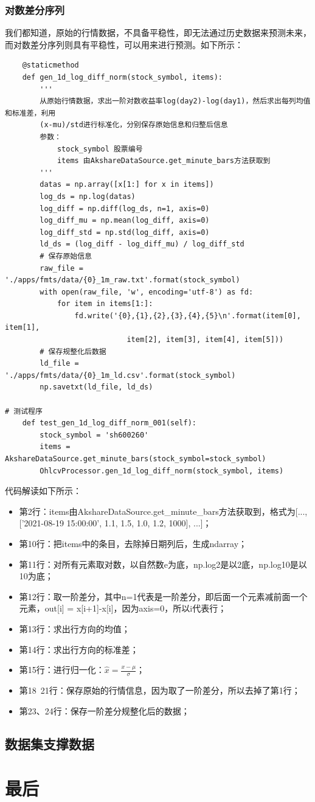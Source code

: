 \subsubsection{对数差分序列}
我们都知道，原始的行情数据，不具备平稳性，即无法通过历史数据来预测未来，而对数差分序列则具有平稳性，可以用来进行预测。如下所示：
\begin{lstlisting}
    @staticmethod
    def gen_1d_log_diff_norm(stock_symbol, items):
        '''
        从原始行情数据，求出一阶对数收益率log(day2)-log(day1)，然后求出每列均值和标准差，利用
        (x-mu)/std进行标准化，分别保存原始信息和归整后信息
        参数：
            stock_symbol 股票编号
            items 由AkshareDataSource.get_minute_bars方法获取到
        '''
        datas = np.array([x[1:] for x in items])
        log_ds = np.log(datas)
        log_diff = np.diff(log_ds, n=1, axis=0)
        log_diff_mu = np.mean(log_diff, axis=0)
        log_diff_std = np.std(log_diff, axis=0)
        ld_ds = (log_diff - log_diff_mu) / log_diff_std
        # 保存原始信息
        raw_file = './apps/fmts/data/{0}_1m_raw.txt'.format(stock_symbol)
        with open(raw_file, 'w', encoding='utf-8') as fd:
            for item in items[1:]:
                fd.write('{0},{1},{2},{3},{4},{5}\n'.format(item[0], item[1], 
                            item[2], item[3], item[4], item[5]))
        # 保存规整化后数据
        ld_file = './apps/fmts/data/{0}_1m_ld.csv'.format(stock_symbol)
        np.savetxt(ld_file, ld_ds)

# 测试程序
    def test_gen_1d_log_diff_norm_001(self):
        stock_symbol = 'sh600260'
        items = AkshareDataSource.get_minute_bars(stock_symbol=stock_symbol)
        OhlcvProcessor.gen_1d_log_diff_norm(stock_symbol, items)
\end{lstlisting}
代码解读如下所示：
\begin{itemize}
    \item 第2行：items由AkshareDataSource.get\_minute\_bars方法获取到，格式为[..., ['2021-08-19 15:00:00', 1.1, 1.5, 1.0, 1.2, 1000], ...]；
    \item 第10行：把items中的条目，去除掉日期列后，生成ndarray；
    \item 第11行：对所有元素取对数，以自然数e为底，np.log2是以2底，np.log10是以10为底；
    \item 第12行：取一阶差分，其中n=1代表是一阶差分，即后面一个元素减前面一个元素，out[i] = x[i+1]-x[i]，因为axis=0，所以i代表行；
    \item 第13行：求出行方向的均值；
    \item 第14行：求出行方向的标准差；
    \item 第15行：进行归一化：$\hat{x}=\frac{x-\mu}{\sigma}$；
    \item 第18~21行：保存原始的行情信息，因为取了一阶差分，所以去掉了第1行；
    \item 第23、24行：保存一阶差分规整化后的数据；
\end{itemize}
\subsection{数据集支撑数据}




\section{最后}